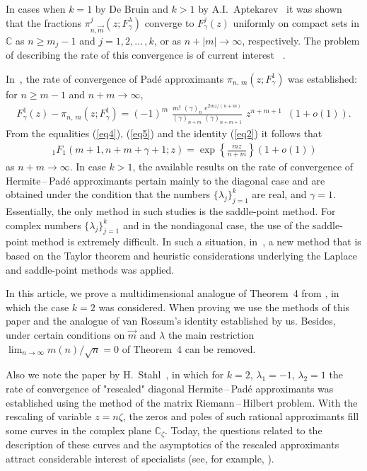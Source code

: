 \documentclass[
11pt,%
tightenlines,%
twoside,%
onecolumn,%
nofloats,%
nobibnotes,%
nofootinbib,%
superscriptaddress,%
noshowpacs,%
centertags]%
{revtex4}
\begin{document}
In cases when $k=1$ by De Bruin \cite{Bruin} and $k>1$ 
by A.I.~Aptekarev~\cite{Aptek} it was shown
that the fractions $\pi^j_{n,\overrightarrow{m}}
(z;F^{\lambda}_{\gamma})$ converge to $F^{j}_{\gamma}(z)$
uniformly on compact sets in $\mathbb{C}$ as $n\geqslant m_j-1$
and  $j=1,2,...\,,k$, or as $n+|m|\rightarrow\infty$,
respectively. The problem of describing the
rate of this convergence is of current interest
~\cite{Star1,Braess,Star5,Kuijl1,Kuijl2,Stahl2,Star2,Star3,Astaf,Star4}.

In \cite {Star5}\,, the rate of convergence of Pad\'e approximants
$\pi_{n,\,m}(z;F^1_{\gamma})$ was established: for $n\geqslant m-1$
and $n+m\rightarrow\infty$,
\begin{eqnarray}\label{eq5}
F^1_{\gamma}(z)-\pi_{n,\,m}(z;F^1_{\gamma})=
(-1)^m\,\,\frac{m!\,\,(\gamma)_n\,\,e^{2mz/(n+m)}}
{(\gamma)_{n+m}\,\,(\gamma)_{n+m+1}}\,\,z^{n+m+1}
                                  \,\,\,(1+o(1)).
\end{eqnarray}
From the equalities (\ref{eq4}), (\ref{eq5}) and the
identity (\ref{eq2}) it follows that
\begin{eqnarray}\label{eq6}
  \,_1F_1(m+1,n+m+\gamma+1;z)= \exp\left\{\frac{mz}{n+m}\right\}(1+o(1))
\end{eqnarray}
as $n+m\rightarrow\infty$. In case $k>1$, the available results
on the rate of convergence of Hermite\,--\,Pad\'e approximants pertain
mainly to the diagonal case and are obtained under the condition that
the numbers $\{\lambda_j\}_{j=1}^k$ are real, and $\gamma=1$.
Essentially, the only method in such studies is the saddle-point
method. For complex numbers $\{\lambda_j\}_{j=1}^k$ and in the
nondiagonal case, the use of the saddle-point method is extremely
difficult. In such a situation, in~\cite {Star1}, a new
method that is based on the Taylor theorem and heuristic considerations
underlying the Laplace and saddle-point methods was applied.

In this article, we prove a multidimensional analogue of Theorem~4
from \cite{Star1}, in which the case $k=2$ was considered. When proving
we use the methods of this paper and the analogue of van Rossum's
identity established by us. Besides, under certain conditions
on $\overrightarrow{m}$ and $\lambda$ the main restriction
$\lim_{n\rightarrow\infty}m(n)/\sqrt{n}=0$ of Theorem~4 can
be removed.

Also we note the paper by H.~Stahl~\cite{Stahl}, in which for $k=2$, 
$\lambda_1=-1$, $\lambda_2=1$ the rate of convergence of "rescaled" 
diagonal Hermite\,--\,Pad\'e approximants was established using 
the method of the matrix Riemann\,--\,Hilbert problem. With the 
rescaling of variable $z=n\zeta$, the zeros and poles
of such rational approximants fill some
curves in the complex plane $\mathbb{C}_{\zeta}$.
Today, the questions related to the description of these
curves and the asymptotics of the rescaled approximants attract
considerable interest of specialists (see, for example,
\cite{Kuijl1,Kuijl2,Stahl2}).
\end{document}
